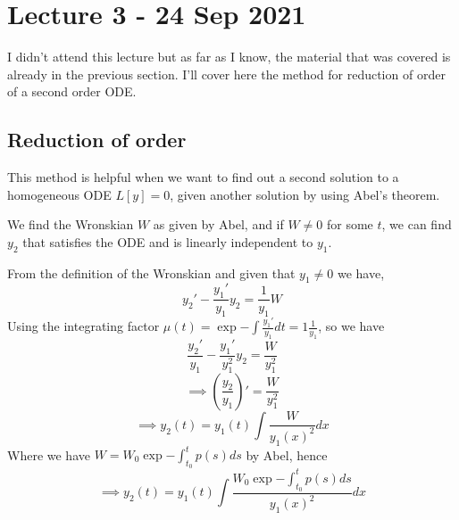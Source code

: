 \section{Lecture 3 - 24 Sep 2021}
I didn't attend this lecture but as far as I know, the material that was covered is
already in the previous section. I'll cover here the method for reduction of order of a
second order ODE.
\subsection{Reduction of order}
This method is helpful when we want to find out a second solution to a homogeneous ODE
$L[y]=0$, given another solution by using Abel's theorem.

We find the Wronskian $W$ as given by Abel, and if $W\neq 0$ for some $t$, we can find
$y_2$ that satisfies the ODE and is linearly independent to $y_1$.

From the definition of the Wronskian and given that $y_1\neq 0$ we have,
\[ y_2' - \frac{y_1'}{y_1}y_2 = \frac{1}{y_1} W\]
Using the integrating factor $\mu (t) = \exp{-\int \frac{y_1'}{y_1}dt} =
1\frac{1}{y_1}$, so we have
\[\frac{y_2'}{y_1}-\frac{y_1'}{y_1^2}y_2 = \frac{W}{y_1^2}\]
\[\implies (\frac{y_2}{y_1})' = \frac{W}{y_1^2} \]
\[\implies y_2(t) = y_1(t) \int \frac{W}{y_1(x)^2} dx\]
Where we have $W=W_0\exp{-\int_{t_0}^t p(s) ds}$ by Abel, hence
\[\implies y_2(t) = y_1(t) \int \frac{W_0\exp{-\int_{t_0}^t p(s) ds}}{y_1(x)^2} dx\]

